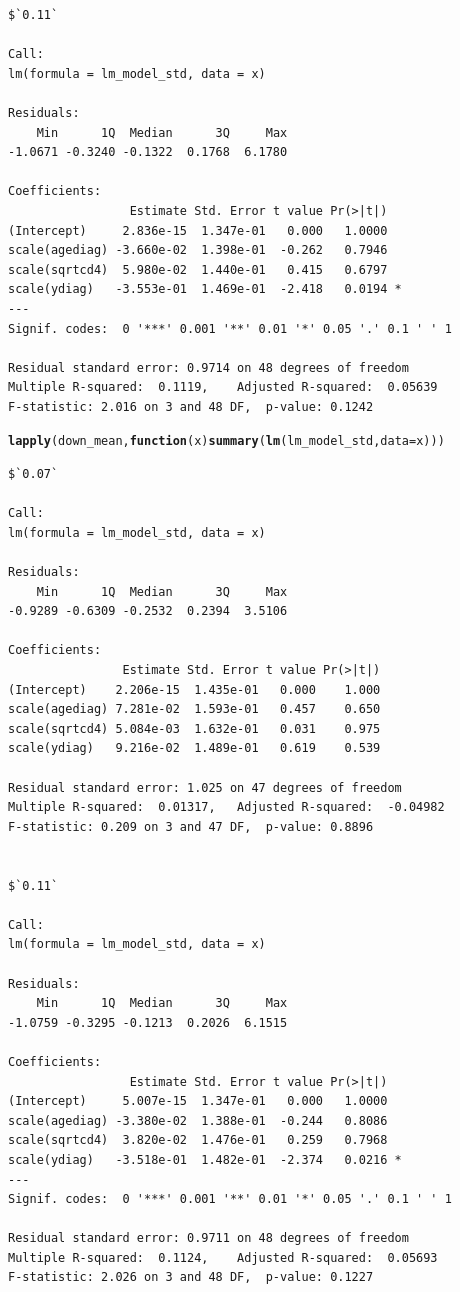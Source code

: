 \documentclass[]{revtex4}\usepackage[]{graphicx}\usepackage[]{color}
\makeatletter
\newcommand{\hlstd}[1]{\textcolor[rgb]{0.345,0.345,0.345}{#1}}%
\newcommand{\hlkwa}[1]{\textcolor[rgb]{0.161,0.373,0.58}{\textbf{#1}}}%
\newcommand{\hlkwc}[1]{\textcolor[rgb]{0.333,0.667,0.333}{#1}}%
\newcommand{\hlkwd}[1]{\textcolor[rgb]{0.737,0.353,0.396}{\textbf{#1}}}%
\newenvironment{kframe}{%
 \def\at@end@of@kframe{}%
 \ifinner\ifhmode%
  \def\at@end@of@kframe{\end{minipage}}%
  \begin{minipage}{\columnwidth}%
 \fi\fi%
 \def\FrameCommand##1{\hskip\@totalleftmargin \hskip-\fboxsep
 \colorbox{shadecolor}{##1}\hskip-\fboxsep
     \hskip-\linewidth \hskip-\@totalleftmargin \hskip\columnwidth}%
 \MakeFramed {\advance\hsize-\width
   \@totalleftmargin\z@ \linewidth\hsize
   \@setminipage}}%
 {\par\unskip\endMakeFramed%
 \at@end@of@kframe}
\newenvironment{knitrout}{}{} %
\makeatother
\begin{document}
\begin{knitrout}
\begin{kframe}
\begin{verbatim}
$`0.11`

Call:
lm(formula = lm_model_std, data = x)

Residuals:
    Min      1Q  Median      3Q     Max 
-1.0671 -0.3240 -0.1322  0.1768  6.1780 

Coefficients:
                 Estimate Std. Error t value Pr(>|t|)  
(Intercept)     2.836e-15  1.347e-01   0.000   1.0000  
scale(agediag) -3.660e-02  1.398e-01  -0.262   0.7946  
scale(sqrtcd4)  5.980e-02  1.440e-01   0.415   0.6797  
scale(ydiag)   -3.553e-01  1.469e-01  -2.418   0.0194 *
---
Signif. codes:  0 '***' 0.001 '**' 0.01 '*' 0.05 '.' 0.1 ' ' 1

Residual standard error: 0.9714 on 48 degrees of freedom
Multiple R-squared:  0.1119,	Adjusted R-squared:  0.05639 
F-statistic: 2.016 on 3 and 48 DF,  p-value: 0.1242
\end{verbatim}
\begin{alltt}
\hlkwd{lapply}\hlstd{(down_mean,} \hlkwa{function}\hlstd{(}\hlkwc{x}\hlstd{)} \hlkwd{summary}\hlstd{(}\hlkwd{lm}\hlstd{(lm_model_std,} \hlkwc{data} \hlstd{= x)))}
\end{alltt}
\begin{verbatim}
$`0.07`

Call:
lm(formula = lm_model_std, data = x)

Residuals:
    Min      1Q  Median      3Q     Max 
-0.9289 -0.6309 -0.2532  0.2394  3.5106 

Coefficients:
                Estimate Std. Error t value Pr(>|t|)
(Intercept)    2.206e-15  1.435e-01   0.000    1.000
scale(agediag) 7.281e-02  1.593e-01   0.457    0.650
scale(sqrtcd4) 5.084e-03  1.632e-01   0.031    0.975
scale(ydiag)   9.216e-02  1.489e-01   0.619    0.539

Residual standard error: 1.025 on 47 degrees of freedom
Multiple R-squared:  0.01317,	Adjusted R-squared:  -0.04982 
F-statistic: 0.209 on 3 and 47 DF,  p-value: 0.8896


$`0.11`

Call:
lm(formula = lm_model_std, data = x)

Residuals:
    Min      1Q  Median      3Q     Max 
-1.0759 -0.3295 -0.1213  0.2026  6.1515 

Coefficients:
                 Estimate Std. Error t value Pr(>|t|)  
(Intercept)     5.007e-15  1.347e-01   0.000   1.0000  
scale(agediag) -3.380e-02  1.388e-01  -0.244   0.8086  
scale(sqrtcd4)  3.820e-02  1.476e-01   0.259   0.7968  
scale(ydiag)   -3.518e-01  1.482e-01  -2.374   0.0216 *
---
Signif. codes:  0 '***' 0.001 '**' 0.01 '*' 0.05 '.' 0.1 ' ' 1

Residual standard error: 0.9711 on 48 degrees of freedom
Multiple R-squared:  0.1124,	Adjusted R-squared:  0.05693 
F-statistic: 2.026 on 3 and 48 DF,  p-value: 0.1227
\end{verbatim}
\end{kframe}
\end{knitrout}
\end{document}

